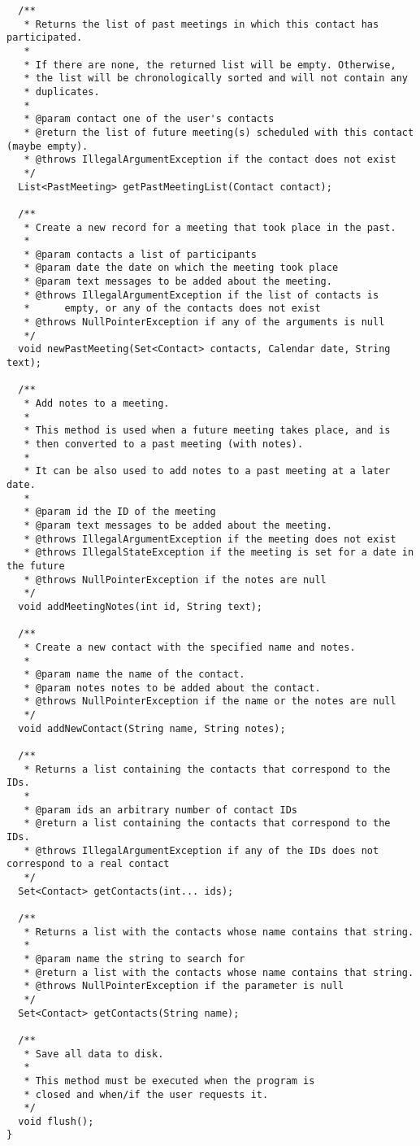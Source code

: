 \documentclass{article}
\begin{document}
\begin{verbatim}
  /**
   * Returns the list of past meetings in which this contact has participated.
   * 
   * If there are none, the returned list will be empty. Otherwise,
   * the list will be chronologically sorted and will not contain any
   * duplicates. 
   * 
   * @param contact one of the user's contacts
   * @return the list of future meeting(s) scheduled with this contact (maybe empty).
   * @throws IllegalArgumentException if the contact does not exist
   */
  List<PastMeeting> getPastMeetingList(Contact contact);

  /**
   * Create a new record for a meeting that took place in the past.
   *
   * @param contacts a list of participants
   * @param date the date on which the meeting took place
   * @param text messages to be added about the meeting. 
   * @throws IllegalArgumentException if the list of contacts is
   *      empty, or any of the contacts does not exist
   * @throws NullPointerException if any of the arguments is null
   */
  void newPastMeeting(Set<Contact> contacts, Calendar date, String text);

  /**
   * Add notes to a meeting. 
   * 
   * This method is used when a future meeting takes place, and is
   * then converted to a past meeting (with notes). 
   * 
   * It can be also used to add notes to a past meeting at a later date.
   * 
   * @param id the ID of the meeting
   * @param text messages to be added about the meeting.  
   * @throws IllegalArgumentException if the meeting does not exist
   * @throws IllegalStateException if the meeting is set for a date in the future
   * @throws NullPointerException if the notes are null
   */
  void addMeetingNotes(int id, String text);

  /**
   * Create a new contact with the specified name and notes.
   * 
   * @param name the name of the contact.
   * @param notes notes to be added about the contact.   
   * @throws NullPointerException if the name or the notes are null
   */
  void addNewContact(String name, String notes);

  /**
   * Returns a list containing the contacts that correspond to the IDs.
   *
   * @param ids an arbitrary number of contact IDs
   * @return a list containing the contacts that correspond to the IDs.
   * @throws IllegalArgumentException if any of the IDs does not correspond to a real contact
   */
  Set<Contact> getContacts(int... ids);

  /**
   * Returns a list with the contacts whose name contains that string. 
   * 
   * @param name the string to search for
   * @return a list with the contacts whose name contains that string. 
   * @throws NullPointerException if the parameter is null
   */
  Set<Contact> getContacts(String name);

  /**
   * Save all data to disk. 
   * 
   * This method must be executed when the program is 
   * closed and when/if the user requests it. 
   */
  void flush();
}
\end{verbatim}
\end{document}
